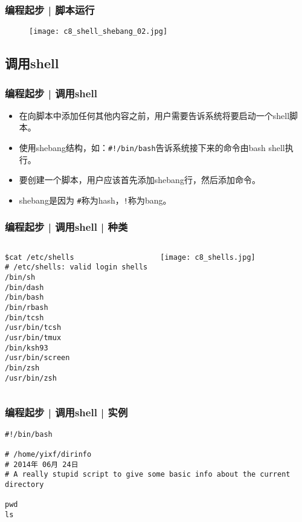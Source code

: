 \begin{frame}
  \frametitle{编程起步 | 脚本运行}
  \begin{figure}
    \centering
    \texttt{[image: c8\_shell\_shebang\_02.jpg]}
  \end{figure}
\end{frame}

\subsection{调用shell}
\begin{frame}[fragile]
  \frametitle{编程起步 | \alert{调用shell}}
  \begin{itemize}
    \item 在向脚本中添加任何其他内容之前，用户需要告诉系统将要启动一个shell脚本。
    \item 使用shebang结构，如：\verb|#!/bin/bash|告诉系统接下来的命令由bash shell执行。
    \item 要创建一个脚本，用户应该首先添加shebang行，然后添加命令。
    \item shebang是因为 \verb|#|称为hash，\verb|!|称为bang。
  \end{itemize}
\end{frame}

\begin{frame}[fragile]
  \frametitle{编程起步 | 调用shell | 种类}
  \begin{columns}
\begin{lstlisting}
$cat /etc/shells
# /etc/shells: valid login shells
/bin/sh
/bin/dash
/bin/bash
/bin/rbash
/bin/tcsh
/usr/bin/tcsh
/usr/bin/tmux
/bin/ksh93
/usr/bin/screen
/bin/zsh
/usr/bin/zsh
\end{lstlisting}
    \texttt{[image: c8\_shells.jpg]}
  \end{columns}
\end{frame}

\begin{frame}[fragile]
  \frametitle{编程起步 | 调用shell | 实例}
\begin{lstlisting}
#!/bin/bash

# /home/yixf/dirinfo
# 2014年 06月 24日
# A really stupid script to give some basic info about the current directory

pwd
ls
\end{lstlisting}
\end{frame}

